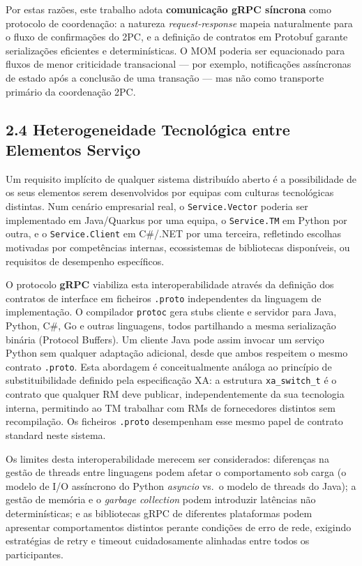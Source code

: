 Por estas razões, este trabalho adota \textbf{comunicação gRPC síncrona} como protocolo de
coordenação: a natureza \textit{request-response} mapeia naturalmente para o fluxo de
confirmações do 2PC, e a definição de contratos em Protobuf garante serializações eficientes e
determinísticas. O MOM poderia ser equacionado para fluxos de menor criticidade transacional ---
por exemplo, notificações assíncronas de estado após a conclusão de uma transação --- mas não
como transporte primário da coordenação 2PC.

\subsection*{2.4 Heterogeneidade Tecnológica entre Elementos Serviço}

Um requisito implícito de qualquer sistema distribuído aberto é a possibilidade de os seus
elementos serem desenvolvidos por equipas com culturas tecnológicas distintas. Num cenário
empresarial real, o \texttt{Service.Vector} poderia ser implementado em Java/Quarkus por uma
equipa, o \texttt{Service.TM} em Python por outra, e o \texttt{Service.Client} em C\#/.NET por
uma terceira, refletindo escolhas motivadas por competências internas, ecossistemas de bibliotecas
disponíveis, ou requisitos de desempenho específicos.

O protocolo \textbf{gRPC} viabiliza esta interoperabilidade através da definição dos contratos de
interface em ficheiros \texttt{.proto} independentes da linguagem de implementação. O compilador
\texttt{protoc} gera stubs cliente e servidor para Java, Python, C\#, Go e outras linguagens,
todos partilhando a mesma serialização binária (Protocol Buffers). Um cliente Java pode assim
invocar um serviço Python sem qualquer adaptação adicional, desde que ambos respeitem o mesmo
contrato \texttt{.proto}. Esta abordagem é conceitualmente análoga ao princípio de
substituibilidade definido pela especificação XA: a estrutura \texttt{xa\_switch\_t} é o contrato
que qualquer RM deve publicar, independentemente da sua tecnologia interna, permitindo ao TM
trabalhar com RMs de fornecedores distintos sem recompilação. Os ficheiros \texttt{.proto}
desempenham esse mesmo papel de contrato standard neste sistema.

Os limites desta interoperabilidade merecem ser considerados: diferenças na gestão de threads
entre linguagens podem afetar o comportamento sob carga (o modelo de I/O assíncrono do Python
\textit{asyncio} vs.\ o modelo de threads do Java); a gestão de memória e o \textit{garbage
collection} podem introduzir latências não determinísticas; e as bibliotecas gRPC de diferentes
plataformas podem apresentar comportamentos distintos perante condições de erro de rede, exigindo
estratégias de retry e timeout cuidadosamente alinhadas entre todos os participantes.

